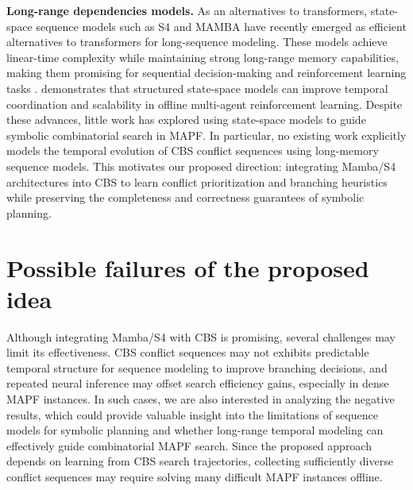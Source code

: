 \documentclass{article}
\theoremstyle{plain}
\theoremstyle{definition}
\theoremstyle{remark}
\begin{document}
\textbf{Long-range dependencies models. } As an alternatives to transformers, state-space sequence models such as S4 and MAMBA have recently emerged as efficient alternatives to transformers for long-sequence modeling. These models achieve linear-time complexity while maintaining strong long-range memory capabilities, making them promising for sequential decision-making and reinforcement learning tasks \cite{gu2021efficiently, gu2023mamba}. \cite{bhattacharya2025multiagent} demonstrates that structured state-space models can improve temporal coordination and scalability in offline multi-agent reinforcement learning. Despite these advances, little work has explored using state-space models to guide symbolic combinatorial search in MAPF. In particular, no existing work explicitly models the temporal evolution of CBS conflict sequences using long-memory sequence models. This motivates our proposed direction: integrating Mamba/S4 architectures into CBS to learn conflict prioritization and branching heuristics while preserving the completeness and correctness guarantees of symbolic planning.
\vspace{-10pt}
\section{Possible failures of the proposed idea}
\vspace{-10pt}
Although integrating Mamba/S4 with CBS is promising, several challenges may limit its effectiveness. CBS conflict sequences may not exhibits predictable temporal structure for sequence modeling to improve branching decisions, and repeated neural inference may offset search efficiency gains, especially in dense MAPF instances. In such cases, we are also interested in analyzing the negative results, which could provide valuable insight into the limitations of sequence models for symbolic planning and whether long-range temporal modeling can effectively guide combinatorial MAPF search. Since the proposed approach depends on learning from CBS search trajectories, collecting sufficiently diverse conflict sequences may require solving many difficult MAPF instances offline.



\end{document}

